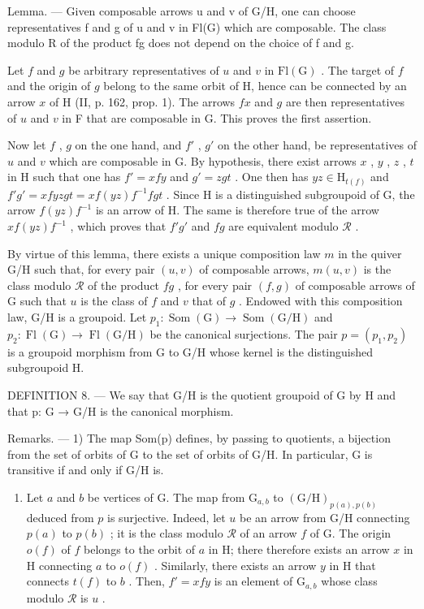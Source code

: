 Lemma. --- Given composable arrows u and v of G/H, one can choose representatives f and g of u and v in Fl(G) which are composable. The class modulo R of the product fg does not depend on the choice of f and g.

Let \(f\) and \(g\) be arbitrary representatives of \(u\) and \(v\) in \(\mathrm{Fl(G)}\) . The target of \(f\) and the origin of \(g\) belong to the same orbit of H, hence can be connected by an arrow \(x\) of H (II, p. 162, prop. 1). The arrows \(fx\) and \(g\) are then representatives of \(u\) and \(v\) in F that are composable in G. This proves the first assertion.

Now let \(f\) , \(g\) on the one hand, and \(f'\) , \(g'\) on the other hand, be representatives of \(u\) and \(v\) which are composable in G. By hypothesis, there exist arrows \(x\) , \(y\) , \(z\) , \(t\) in H such that one has \(f' = xfy\) and \(g' = zgt\) . One then has \(yz \in \mathrm{H}_{t(f)}\) and \(f'g' = x f y z g t = x f(yz)f^{-1}f g t\) . Since H is a distinguished subgroupoid of G, the arrow \(f(yz)f^{-1}\) is an arrow of H. The same is therefore true of the arrow \(x f(yz)f^{-1}\) , which proves that \(f'g'\) and \(fg\) are equivalent modulo \(\mathcal{R}\) .

By virtue of this lemma, there exists a unique composition law \(m\) in the quiver G/H such that, for every pair \((u,v)\) of composable arrows, \(m(u,v)\) is the class modulo \(\mathcal{R}\) of the product \(fg\) , for every pair \((f,g)\) of composable arrows of G such that \(u\) is the class of \(f\) and \(v\) that of \(g\) . Endowed with this composition law, G/H is a groupoid. Let \(p_1\colon \operatorname{Som}(\mathrm{G}) \to \operatorname{Som}(\mathrm{G}/\mathrm{H})\) and \(p_2\colon \operatorname{Fl}(\mathrm{G}) \to \operatorname{Fl}(\mathrm{G}/\mathrm{H})\) be the canonical surjections. The pair \(p = (p_1,p_2)\) is a groupoid morphism from G to G/H whose kernel is the distinguished subgroupoid H.

DEFINITION 8. --- We say that G/H is the quotient groupoid of G by H and that p: G → G/H is the canonical morphism.

Remarks. --- 1) The map Som(p) defines, by passing to quotients, a bijection from the set of orbits of G to the set of orbits of G/H. In particular, G is transitive if and only if G/H is.

\begin{enumerate}
\def\labelenumi{\arabic{enumi})}
\setcounter{enumi}{1}
\tightlist
\item
  Let \(a\) and \(b\) be vertices of G. The map from \(\mathrm{G}_{a,b}\) to \((\mathrm{G} / \mathrm{H})_{p(a),p(b)}\) deduced from \(p\) is surjective. Indeed, let \(u\) be an arrow from G/H connecting \(p(a)\) to \(p(b)\) ; it is the class modulo \(\mathcal{R}\) of an arrow \(f\) of G. The origin \(o(f)\) of \(f\) belongs to the orbit of \(a\) in H; there therefore exists an arrow \(x\) in H connecting \(a\) to \(o(f)\) . Similarly, there exists an arrow \(y\) in H that connects \(t(f)\) to \(b\) . Then, \(f' = xfy\) is an element of \(\mathrm{G}_{a,b}\) whose class modulo \(\mathcal{R}\) is \(u\) .
\end{enumerate}

